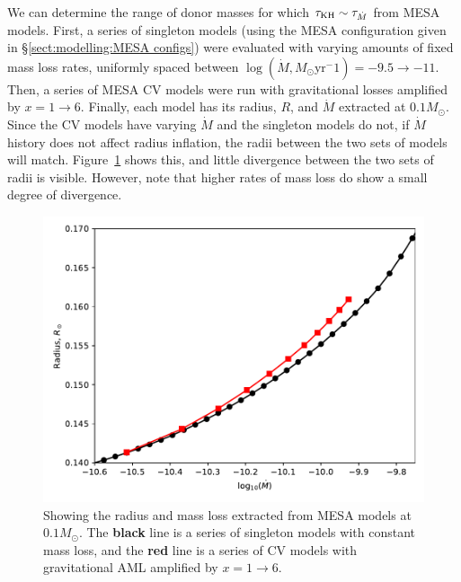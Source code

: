 We can determine the range of donor masses for which $\tau_{\rm KH} \sim \tau_{\dot M}$ from MESA models.
First, a series of singleton models (using the MESA configuration given in \S\ref{sect:modelling:MESA configs}) were evaluated with varying amounts of fixed mass loss rates, uniformly spaced between $\log (\dot M, M_\odot \mathrm{yr}^-1) = -9.5 \rightarrow -11$.
Then, a series of MESA CV models were run with gravitational losses amplified by $x = 1 \rightarrow 6$.
Finally, each model has its radius, $R$, and $\dot M$ extracted at $0.1 M_\odot$. Since the CV models have varying $\dot M$ and the singleton models do not, if $\dot M$ history does not affect radius inflation, the radii between the two sets of models will match. Figure~\ref{fig:results:comparing radii at 0.1Msun} shows this, and little divergence between the two sets of radii is visible. However, note that higher rates of mass loss do show a small degree of divergence.
\begin{figure}
    \centering
    \includegraphics[width=.8\textwidth]{figures/modelling/compare_0.1Msun_with_CV_track_K11_fig1.pdf}
    \caption{Showing the radius and mass loss extracted from MESA models at $0.1 M_\odot$. The {\bf black} line is a series of singleton models with constant mass loss, and the {\bf red} line is a series of CV models with gravitational AML amplified by $x = 1 \rightarrow 6$.}
    \label{fig:results:comparing radii at 0.1Msun}
\end{figure}

